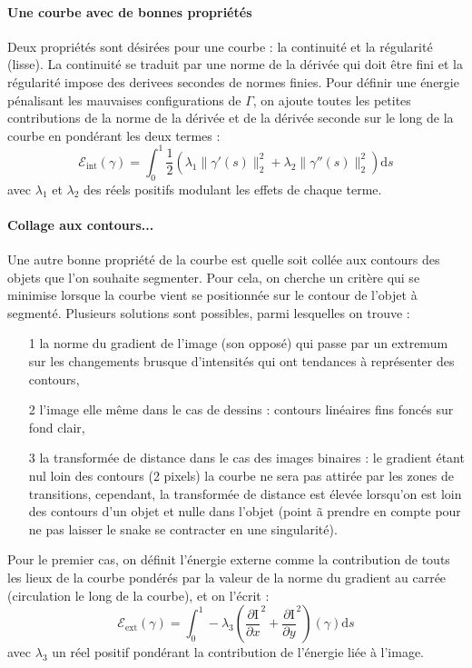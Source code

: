 \documentclass[10pt,a4paper]{article}
\begin{document}
\paragraph{Une courbe avec de bonnes propri\'{e}t\'{e}s} Deux propri\'{e}t\'{e}s sont désir\'{e}es pour une courbe : la continuit\'{e} et la r\'{e}gularit\'{e} (lisse). La continuit\'{e} se traduit par une norme de la dériv\'{e}e qui doit \^{e}tre fini et la r\'{e}gularit\'{e} impose des derivees secondes de normes finies. Pour d\'{e}finir une \'{e}nergie p\'{e}nalisant les mauvaises configurations de $\Gamma$, on ajoute toutes les petites contributions de la norme de la d\'{e}riv\'{e}e et de la d\'{e}riv\'{e}e seconde sur le long de la courbe en pond\'{e}rant les deux termes : 
\begin{displaymath}
	\mathcal{E}_{\text{int}}(\gamma) = \int_{0}^{1} \frac{1}{2} \left(\lambda_1 \|\gamma'(s) \|_{2}^{2} + \lambda_2 \|\gamma''(s) \|_{2}^{2}\right) \mathrm{d}s
\end{displaymath}
avec $\lambda_1$ et $\lambda_2$ des r\'{e}els positifs modulant les effets de chaque terme.

\paragraph{Collage aux contours...} Une autre bonne propri\'{e}t\'{e} de la courbe est quelle soit coll\'{e}e aux contours des objets que l'on souhaite segmenter. Pour cela, on cherche un crit\`{e}re qui se minimise lorsque la courbe vient se positionn\'{e}e sur le contour de l'objet \`{a} segment\'{e}. Plusieurs solutions sont possibles, parmi lesquelles on trouve : 
\begin{itemize}
	\item[1] la norme du gradient de l'image (son oppos\'{e}) qui passe par un extremum sur les changements brusque d'intensit\'{e}s qui ont tendances \`{a} repr\'{e}senter des contours,
	\item[2] l'image elle m\^{e}me dans le cas de dessins : contours lin\'{e}aires fins fonc\'{e}s sur fond clair,
	\item[3] la transform\'{e}e de distance dans le cas des images binaires : le gradient \'{e}tant nul loin des contours (2 pixels) la courbe ne sera pas attir\'{e}e par les zones de transitions, cependant, la transform\'{e}e de distance est \'{e}lev\'{e}e lorsqu'on est loin des contours d'un objet et nulle dans l'objet (point \~{a} prendre en compte pour ne pas laisser le snake se contracter en une singularit\'{e}).
\end{itemize}
Pour le premier cas, on d\'{e}finit l'\'{e}nergie externe comme la contribution de touts les lieux de la courbe pond\'{e}r\'{e}s par la valeur de la norme du gradient au carr\'{e}e (circulation le long de la courbe), et on l'\'{e}crit : 
\begin{displaymath}
	\mathcal{E}_{\text{ext}}(\gamma) = \int_{0}^{1} - \lambda_3    \left( \frac{\partial \text{I}}{\partial x}^{2} + \frac{\partial \text{I}}{\partial y} ^{2} \right)(\gamma ) \mathrm{d}s
\end{displaymath}
avec $\lambda_3$ un r\'{e}el positif pond\'{e}rant la contribution de l'\'{e}nergie li\'{e}e \`{a} l'image.
\end{document}
